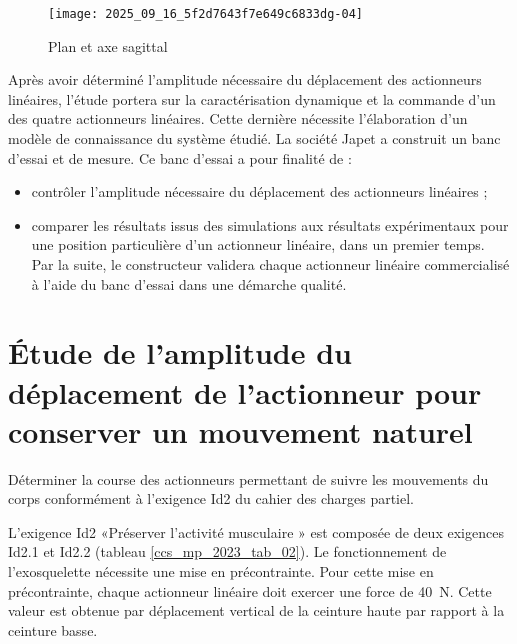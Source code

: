 
\begin{figure}[!h]
\centering
\texttt{[image: 2025\_09\_16\_5f2d7643f7e649c6833dg-04]}
\caption{\label{ccs_mp_2023_fig_05}  Plan et axe sagittal}
\end{figure}





Après avoir déterminé l'amplitude nécessaire du déplacement des actionneurs linéaires, l'étude portera sur la caractérisation dynamique et la commande d'un des quatre actionneurs linéaires. Cette dernière nécessite l'élaboration d'un modèle de connaissance du système étudié. La société Japet a construit un banc d'essai et de mesure. Ce banc d'essai a pour finalité de :

\begin{itemize}
  \item contrôler l'amplitude nécessaire du déplacement des actionneurs linéaires ;
  \item comparer les résultats issus des simulations aux résultats expérimentaux pour une position particulière d'un actionneur linéaire, dans un premier temps.\\
Par la suite, le constructeur validera chaque actionneur linéaire commercialisé à l'aide du banc d'essai dans une démarche qualité.
\end{itemize}

\section{Étude de l'amplitude du déplacement de l'actionneur pour conserver un mouvement naturel} %
\begin{obj}
Déterminer la course des actionneurs permettant de suivre les mouvements du corps conformément à l'exigence Id2 du cahier des charges partiel.
\end{obj}


L'exigence Id2 «Préserver l'activité musculaire » est composée de deux exigences Id2.1 et Id2.2 (tableau \ref{ccs_mp_2023_tab_02}). Le fonctionnement de l'exosquelette nécessite une mise en précontrainte. Pour cette mise en précontrainte, chaque actionneur linéaire doit exercer une force de \SI{40}{N}. Cette valeur est obtenue par déplacement vertical de la ceinture haute par rapport à la ceinture basse.

